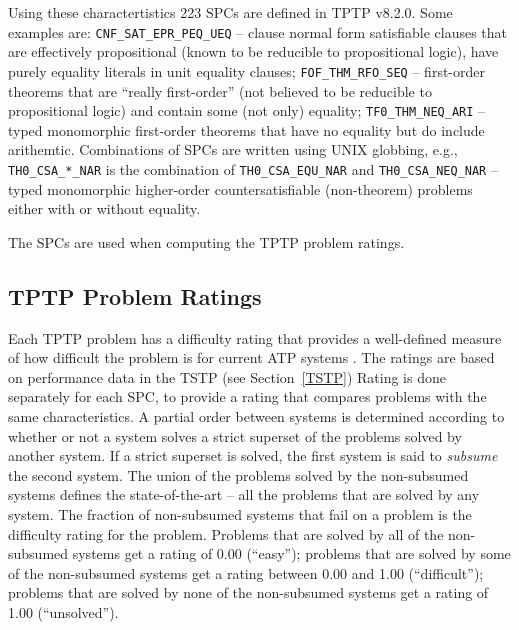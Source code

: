 \documentclass[runningheads]{llncs}
\begin{document}
Using these charactertistics 223 SPCs are defined in TPTP v8.2.0.
Some examples are:
{\tt CNF\_SAT\_EPR\_PEQ\_UEQ} -- clause normal form satisfiable clauses that are effectively
propositional (known to be reducible to propositional logic), have purely equality literals
in unit equality clauses;
{\tt FOF\_THM\_RFO\_SEQ} -- first-order theorems that are ``really first-order'' (not believed
to be reducible to propositional logic) and contain some (not only) equality;
{\tt TF0\_THM\_NEQ\_ARI} -- typed monomorphic first-order theorems that have no equality but do
include arithemtic.
Combinations of SPCs are written using UNIX globbing, e.g., {\tt TH0\_CSA\_*\_NAR} is the
combination of {\tt TH0\_CSA\_EQU\_NAR} and {\tt TH0\_CSA\_NEQ\_NAR} -- typed monomorphic 
higher-order countersatisfiable (non-theorem) problems either with or without equality.

The SPCs are used when computing the TPTP problem ratings.

\subsection{TPTP Problem Ratings}
\label{Ratings}

Each TPTP problem has a difficulty rating that provides a well-defined measure of how difficult 
the problem is for current ATP systems \cite{SS01}.
The ratings are based on performance data in the TSTP (see Section~\ref{TSTP})
Rating is done separately for each SPC, to provide a rating that compares problems with the
same characteristics.
A partial order between systems is determined according to whether or not a system solves a strict 
superset of the problems solved by another system. 
If a strict superset is solved, the first system is said to {\em subsume} the second system. 
The union of the problems solved by the non-subsumed systems defines the state-of-the-art -- all 
the problems that are solved by any system. 
The fraction of non-subsumed systems that fail on a problem is the difficulty rating for the 
problem. 
Problems that are solved by all of the non-subsumed systems get a rating of 0.00 (``easy'');
problems that are solved by some of the non-subsumed systems get a rating between 
0.00 and 1.00 (``difficult''); 
problems that are solved by none of the non-subsumed systems get a rating of 1.00 (``unsolved'').

\end{document}
